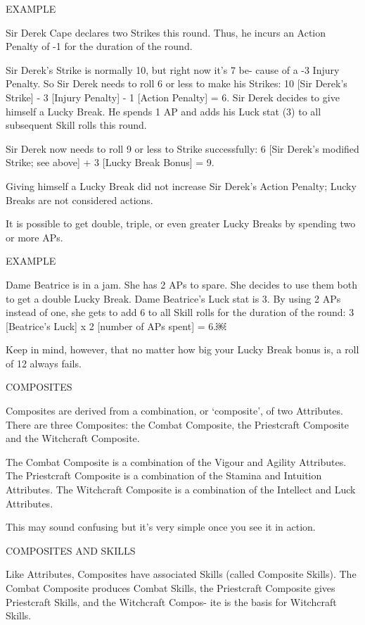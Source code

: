 \documentclass[11pt,twocolumn]{book}
\begin{document}
\begin{mdframed}
EXAMPLE

Sir Derek Cape declares two Strikes this round. Thus, he incurs an Action Penalty of -1 for the duration of the round.

Sir Derek’s Strike is normally 10, but right now it’s 7 be- cause of a -3 Injury Penalty. So Sir Derek needs to roll 6 or less to make his Strikes: 10 [Sir Derek’s Strike] - 3 [Injury Penalty] - 1 [Action Penalty] = 6. Sir Derek decides to give himself a Lucky Break. He spends 1 AP and adds his Luck stat (3) to all subsequent Skill rolls this round.

Sir Derek now needs to roll 9 or less to Strike successfully: 6 [Sir Derek’s modified Strike; see above] + 3 [Lucky Break Bonus] = 9.

Giving himself a Lucky Break did not increase Sir Derek’s Action Penalty; Lucky Breaks are not considered actions.
\end{mdframed}

It is possible to get double, triple, or even greater Lucky Breaks by spending two or more APs.

\begin{mdframed}
EXAMPLE

Dame Beatrice is in a jam. She has 2 APs to spare. She decides to use them both to get a double Lucky Break. Dame Beatrice’s Luck stat is 3. By using 2 APs instead of one, she gets to add 6 to all Skill rolls for the duration of the round: 3 [Beatrice’s Luck] x 2 [number of APs spent] = 6.￼
\end{mdframed}

Keep in mind, however, that no matter how big your Lucky Break bonus is, a roll of 12 always fails.

COMPOSITES

Composites are derived from a combination, or ‘composite’, of two Attributes. There are three Composites: the Combat Composite, the Priestcraft Composite and the Witchcraft Composite.

The Combat Composite is a combination of the Vigour and Agility Attributes. The Priestcraft Composite is a combination of the Stamina and Intuition Attributes. The Witchcraft Composite is a combination of the Intellect and Luck Attributes.

This may sound confusing but it’s very simple once you see it in action.

COMPOSITES AND SKILLS

Like Attributes, Composites have associated Skills (called Composite Skills). The Combat Composite produces Combat Skills, the Priestcraft Composite gives Priestcraft Skills, and the Witchcraft Compos- ite is the basis for Witchcraft Skills.
\end{document}
